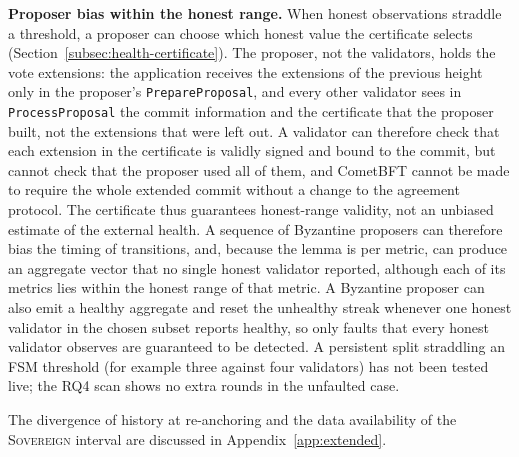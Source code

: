 \textbf{Proposer bias within the honest range.} When honest observations
straddle a threshold, a proposer can choose which honest value the certificate
selects (Section~\ref{subsec:health-certificate}). The proposer, not the validators, holds the vote extensions: the application receives the extensions of the previous height only in the proposer's \texttt{PrepareProposal}, and every other validator sees in \texttt{ProcessProposal} the commit information and the certificate that the proposer built, not the extensions that were left out. A validator can therefore check that each extension in the certificate is validly signed and bound to the commit, but cannot check that the proposer used all of them, and CometBFT cannot be made to require the whole extended commit without a change to the agreement protocol. The certificate thus guarantees honest-range validity, not an unbiased estimate of the external health. A sequence of Byzantine
proposers can therefore bias the timing of transitions, and, because the lemma is per metric, can produce an aggregate vector that no single honest validator reported, although each of its metrics lies within the honest range of that metric. A Byzantine proposer can also emit a healthy aggregate and reset the unhealthy streak whenever one honest validator in the chosen subset reports healthy, so only faults that every honest validator observes are guaranteed to be detected. A persistent split straddling an FSM
threshold (for example three against four validators) has not been tested live;
the RQ4 scan shows no extra rounds in the unfaulted case.

The divergence of history at re-anchoring and the data availability of the \textsc{Sovereign} interval are discussed in Appendix~\ref{app:extended}.

